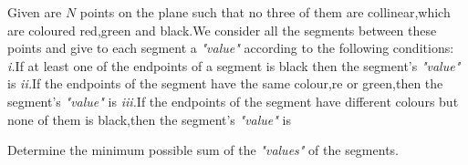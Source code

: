 Given are $N$ points on the plane such that no three of them are collinear,which are coloured red,green and black.We consider all the segments between these points and give to each segment a \textit{"value"} according to the following conditions:
\textit{i.}If at least one of the endpoints of a segment is black then the segment's \textit{"value"} is 
\textit{ii.}If the endpoints of the segment have the same colour,re or green,then the segment's \textit{"value"} is 
\textit{iii.}If the endpoints of the segment have different colours but none of them is black,then the segment's \textit{"value"} is 

Determine the minimum possible sum of the \textit{"values"} of the segments.